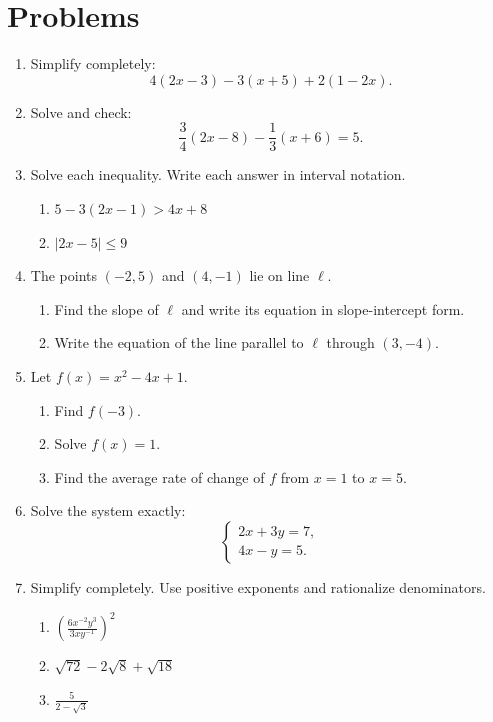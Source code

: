 \documentclass[12pt]{article}
\begin{document}
\section*{Problems}
\begin{enumerate}[leftmargin=*,itemsep=1.2em]
  \item Simplify completely:
  \[
    4(2x-3)-3(x+5)+2(1-2x).
  \]

  \item Solve and check:
  \[
    \frac34(2x-8)-\frac13(x+6)=5.
  \]

  \item Solve each inequality. Write each answer in interval notation.
  \begin{enumerate}[label=(\alph*),itemsep=0.4em]
    \item $5-3(2x-1)>4x+8$
    \item $|2x-5|\le9$
  \end{enumerate}

  \item The points $(-2,5)$ and $(4,-1)$ lie on line $\ell$.
  \begin{enumerate}[label=(\alph*),itemsep=0.4em]
    \item Find the slope of $\ell$ and write its equation in slope-intercept form.
    \item Write the equation of the line parallel to $\ell$ through $(3,-4)$.
  \end{enumerate}

  \item Let $f(x)=x^2-4x+1$.
  \begin{enumerate}[label=(\alph*),itemsep=0.4em]
    \item Find $f(-3)$.
    \item Solve $f(x)=1$.
    \item Find the average rate of change of $f$ from $x=1$ to $x=5$.
  \end{enumerate}

  \item Solve the system exactly:
  \[
    \begin{cases}
      2x+3y=7,\\
      4x-y=5.
    \end{cases}
  \]

  \item Simplify completely. Use positive exponents and rationalize denominators.
  \begin{enumerate}[label=(\alph*),itemsep=0.5em]
    \item $\displaystyle \left(\frac{6x^{-2}y^3}{3xy^{-1}}\right)^2$
    \item $\sqrt{72}-2\sqrt8+\sqrt{18}$
    \item $\displaystyle \frac5{2-\sqrt3}$
  \end{enumerate}


\end{enumerate}
\end{document}
